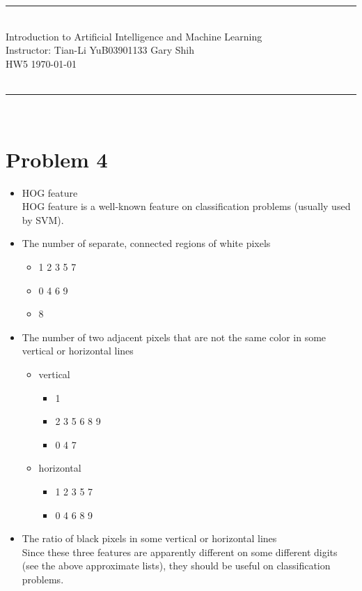 \documentclass[12pt, a4paper]{article}
\begin{document}
{\bf \noindent
\rule[3pt]{\textwidth}{0.3pt}\\
Introduction to Artificial Intelligence
and Machine Learning \hfill \\
Instructor: Tian-Li Yu\hfill B03901133 Gary Shih \\
HW5 \hfill \today\\
\vspace{-10pt} \\
\rule[3pt]{\textwidth}{1.3pt}\\
[-1cm]
}

\section*{Problem 4}

\begin{itemize}
  \item HOG feature \\
    HOG feature is a well-known feature on classification problems (usually used by SVM).
  \item The number of separate, connected regions of white pixels
    \begin{itemize}
      \item 1 2 3 5 7
      \item 0 4 6 9
      \item 8
    \end{itemize}
  \item The number of two adjacent pixels that are not the same color in some vertical or horizontal lines
    \begin{itemize}
      \item vertical
        \begin{itemize}
          \item 1
          \item 2 3 5 6 8 9
          \item 0 4 7
        \end{itemize}
      \item horizontal
        \begin{itemize}
          \item 1 2 3 5 7
          \item 0 4 6 8 9
        \end{itemize}
    \end{itemize}
  \item The ratio of black pixels in some vertical or horizontal lines \\
    Since these three features are apparently different on some different digits (see the above approximate lists),
    they should be useful on classification problems.

\end{itemize}
\end{document}

